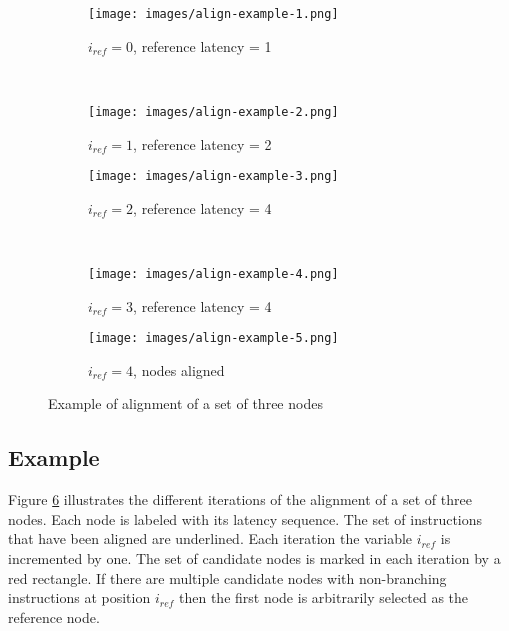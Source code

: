\begin{figure}
    \centering
    \begin{subfigure}[t]{0.5\textwidth}
        \centering
        \texttt{[image: images/align-example-1.png]}
        \caption{$i_{ref}=0$, reference latency = 1}
        \label{fig:align-example-1}
    \end{subfigure}%
    ~
	\begin{subfigure}[t]{0.5\textwidth}
    \centering
    \texttt{[image: images/align-example-2.png]}
    \caption{$i_{ref}=1$, reference latency = 2}
    \label{fig:align-example-2}
    \end{subfigure}%
  	
	\begin{subfigure}[t]{0.5\textwidth}
		\centering
    	\texttt{[image: images/align-example-3.png]}
    	\caption{$i_{ref}=2$, reference latency = 4}
    	\label{fig:align-example-3}
    \end{subfigure}%
    ~
    \begin{subfigure}[t]{0.5\textwidth}
    \centering
    \texttt{[image: images/align-example-4.png]}
    \caption{$i_{ref}=3$, reference latency = 4}
    \label{fig:align-example-4}
    \end{subfigure}
    
    \begin{subfigure}[t]{0.5\textwidth}
    \centering
    \texttt{[image: images/align-example-5.png]}
    \caption{$i_{ref}=4$, nodes aligned}
    \label{fig:align-example-5}
    \end{subfigure}

    \caption{Example of alignment of a set of three nodes}
    \label{fig:align-example}
\end{figure}

\subsection{Example}
Figure \ref{fig:align-example} illustrates the different iterations of the alignment of a set of three nodes. 
Each node is labeled with its latency sequence. The set of instructions that have been aligned are underlined. Each iteration the variable $i_{ref}$ is incremented by one. 
The set of candidate nodes is marked in each iteration by a red rectangle. 
If there are multiple candidate nodes with non-branching instructions at position $i_{ref}$ then the first node is arbitrarily selected as the reference node.  


